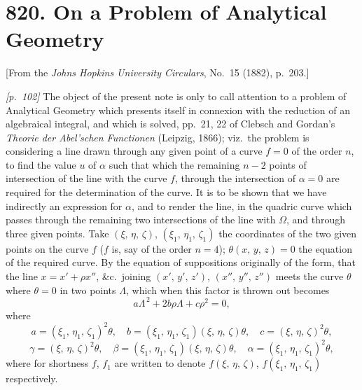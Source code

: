 \documentclass[11pt,a4paper]{book}
\begin{document}
\bigskip

\section*{820. On a Problem of Analytical Geometry}

\begin{center}
\small[From the \textit{Johns Hopkins University Circulars}, No.~15 (1882), p.~203.]
\end{center}

\bigskip

\noindent\textit{[p.~102]} The object of the present note is only to call attention to a problem of Analytical Geometry which presents itself in connexion with the reduction of an algebraical integral, and which is solved, pp.~21, 22 of Clebsch and Gordan's \textit{Theorie der Abel'schen Functionen} (Leipzig, 1866); viz.\ the problem is considering a line drawn through any given point of a curve $f=0$ of the order $n$, to find the value $u$ of $\alpha$ such that which the remaining $n - 2$ points of intersection of the line with the curve $f$, through the intersection of $\alpha = 0$ are required for the determination of the curve. It is to be shown that we have indirectly an expression for $\alpha$, and to render the line, in the quadric curve which passes through the remaining two intersections of the line with $\Omega$, and through three given points. Take $(\xi,\,\eta,\,\zeta)$, $(\xi_1,\,\eta_1,\,\zeta_1)$ the coordinates of the two given points on the curve $f$ ($f$ is, say of the order $n = 4$); $\theta(x,\,y,\,z) = 0$ the equation of the required curve. By the equation of suppositions originally of the form, that the line $x = x' + \rho x''$, \&c.\ joining $(x',\,y',\,z')$, $(x'',\,y'',\,z'')$ meets the curve $\theta$ where $\theta = 0$ in two points $\Lambda$, which when this factor is thrown out becomes
\[
a\Lambda^{\,2} + 2b\rho\Lambda + c\rho^2 = 0,
\]
where
\[
a = (\xi_1,\,\eta_1,\,\zeta_1)^2 \theta,\quad b = (\xi_1,\,\eta_1,\,\zeta_1)(\xi,\,\eta,\,\zeta)\theta,\quad c = (\xi,\,\eta,\,\zeta)^2 \theta,
\]
\[
\gamma = (\xi,\,\eta,\,\zeta)^2 \theta,\quad \beta = (\xi_1,\,\eta_1,\,\zeta_1)(\xi,\,\eta,\,\zeta)\theta,\quad \alpha = (\xi_1,\,\eta_1,\,\zeta_1)^2 \theta,
\]
where for shortness $f$, $f_1$ are written to denote $f(\xi,\,\eta,\,\zeta)$, $f(\xi_1,\,\eta_1,\,\zeta_1)$ respectively.
\end{document}
